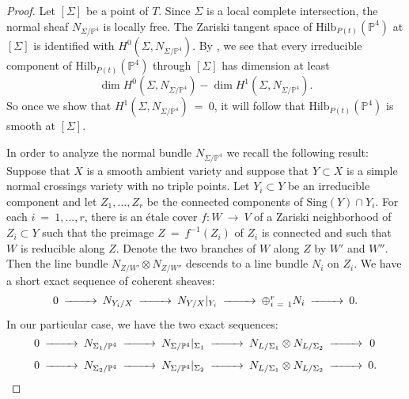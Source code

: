 \documentclass[twoside,12pt,reqno]{amsart}
\theoremstyle{plain}
\theoremstyle{definition}
\newcommand{\PP}{\mathbb{P}}
\def\ps{\vspace{4pt}}
\begin{document}
\begin{proof}
Let $[\Sigma]$ be a point of $T$.  Since $\Sigma$ is a local complete
intersection, the normal sheaf $N_{\Sigma/\PP^4}$ is locally free.  The
Zariski tangent space of $\text{Hilb}_{P(t)}(\PP^4)$ at $[\Sigma]$ is
identified with $H^0(\Sigma,N_{\Sigma/\PP^4})$.  By \cite[theorem I.2.15.2]{K},
we see that every irreducible component of
$\text{Hilb}_{P(t)}(\PP^4)$ through $[\Sigma]$ has dimension at least 
\begin{equation}\dim  H^0(\Sigma,N_{\Sigma/\PP^4}) - \dim 
H^1(\Sigma,N_{\Sigma/\PP^4}).\end{equation} 
So once we show that $H^1(\Sigma,N_{\Sigma/\PP^4})~=~0$, it will follow
that $\text{Hilb}_{P(t)}(\PP^4)$ is smooth at $[\Sigma]$.

\ps

In order to analyze the normal bundle $N_{\Sigma/\PP^4}$ we recall the
following result: Suppose that $X$ is a smooth ambient
variety and suppose that $Y\subset X$ is a simple normal crossings
variety with no triple points.  Let $Y_i\subset Y$ be an irreducible
component and let $Z_1,\dots,Z_r$ be the connected components of
$\text{Sing}(Y)\cap Y_i$.  For each $i~=~1,\dots,r$, there is an \'etale
cover $f:W~\rightarrow~ V$ of a Zariski neighborhood of $Z_i\subset Y$
such that the preimage $Z~=~f^{-1}(Z_i)$ of $Z_i$ is connected and such that $W$
is reducible along $Z$.  Denote the two branches of $W$ along
$Z$ by $W'$ and $W''$.  Then the line bundle $N_{Z/W'}\otimes
N_{Z/W''}$ descends to a line bundle $N_i$ on $Z_i$.  We have a short
exact sequence of coherent sheaves:
\begin{equation}\begin{CD}
0 @>>> N_{Y_i/X} @>>> N_{Y/X}|_{Y_i} @>>> \oplus_{i~=~1}^r N_i @>>> 0.
\end{CD} \end{equation}
In our particular case, we have the two exact sequences:
\begin{equation}\begin{CD}
0 @>>> N_{\Sigma_1/\PP^4} @>>> N_{\Sigma/\PP^4}|_{\Sigma_1} @>>>
N_{L/\Sigma_1}\otimes N_{L/\Sigma_2} @>>> 0 \\
0 @>>> N_{\Sigma_2/\PP^4} @>>> N_{\Sigma/\PP^4}|_{\Sigma_2} @>>> 
N_{L/\Sigma_1}\otimes N_{L/\Sigma_2} @>>> 0.
\end{CD} \end{equation}

\ps


\end{proof}
\end{document}
